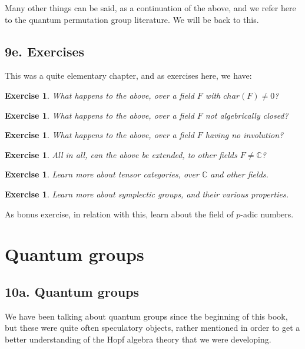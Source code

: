 \documentclass[12pt]{amsbook}
\newtheorem{exercise}[theorem]{Exercise}
\begin{document}
Many other things can be said, as a continuation of the above, and we refer here to the quantum permutation group literature. We will be back to this.

\section*{9e. Exercises}

This was a quite elementary chapter, and as exercises here, we have:

\begin{exercise}
What happens to the above, over a field $F$ with $char(F)\neq0$?
\end{exercise}

\begin{exercise}
What happens to the above, over a field $F$ not algebrically closed?
\end{exercise}

\begin{exercise}
What happens to the above, over a field $F$ having no involution?
\end{exercise}

\begin{exercise}
All in all, can the above be extended, to other fields $F\neq\mathbb C$?
\end{exercise}

\begin{exercise}
Learn more about tensor categories, over $\mathbb C$ and other fields.
\end{exercise}

\begin{exercise}
Learn more about symplectic groups, and their various properties.
\end{exercise}

As bonus exercise, in relation with this, learn about the field of $p$-adic numbers.

\chapter{Quantum groups}

\section*{10a. Quantum groups}

We have been talking about quantum groups since the beginning of this book, but these were quite often speculatory objects, rather mentioned in order to get a better understanding of the Hopf algebra theory that we were developing.
\end{document}

